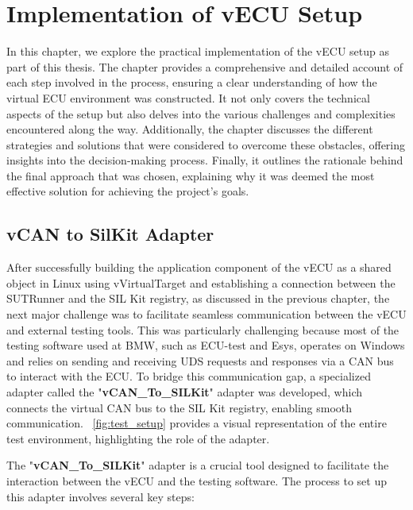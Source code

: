 
\chapter{Implementation of vECU Setup}\label{chapter:Implementation}
In this chapter, we explore the practical implementation of the vECU setup as part of this thesis. The chapter provides a comprehensive and detailed account of each step involved in the process, ensuring a clear understanding of how the virtual ECU environment was constructed. It not only covers the technical aspects of the setup but also delves into the various challenges and complexities encountered along the way. Additionally, the chapter discusses the different strategies and solutions that were considered to overcome these obstacles, offering insights into the decision-making process. Finally, it outlines the rationale behind the final approach that was chosen, explaining why it was deemed the most effective solution for achieving the project’s goals.

\section{vCAN to SilKit Adapter}
After successfully building the application component of the vECU as a shared object in Linux using vVirtualTarget and establishing a connection between the SUTRunner and the SIL Kit registry, as discussed in the previous chapter, the next major challenge was to facilitate seamless communication between the vECU and external testing tools. This was particularly challenging because most of the testing software used at BMW, such as ECU-test \cite{ecu_test} and Esys, operates on Windows and relies on sending and receiving UDS requests and responses via a CAN bus to interact with the ECU. To bridge this communication gap, a specialized adapter called the "\textbf{vCAN\_To\_SILKit}" adapter was developed, which connects the virtual CAN bus to the SIL Kit registry, enabling smooth communication. ~\autoref{fig:test_setup} provides a visual representation of the entire test environment, highlighting the role of the adapter.

The "\textbf{vCAN\_To\_SILKit}" adapter is a crucial tool designed to  facilitate the interaction between the vECU and the testing software. The process to set up this adapter involves several key steps:


